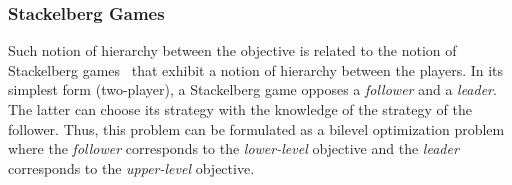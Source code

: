 \subsubsection{Stackelberg Games}

Such notion of hierarchy between the objective is related to the notion of Stackelberg games~\citet{von1934marktform,conitzer2006computing,fiez2020convergence} that exhibit a notion of hierarchy between the players. In its simplest form (two-player), a Stackelberg game opposes a \emph{follower} and a \emph{leader}. The latter can choose its strategy with the knowledge of the strategy of the follower. Thus, this problem can be formulated as a bilevel optimization problem where the \emph{follower} corresponds to the \emph{lower-level} objective and the \emph{leader} corresponds to the \emph{upper-level} objective.










